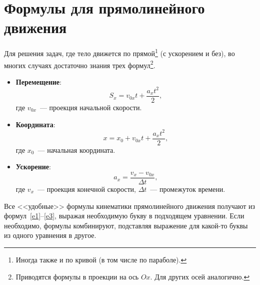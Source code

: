 \documentclass[main.tex]{subfiles}
\begin{document}


\pagestyle{empty}

 

\setcounter{section}{6
}
\addtocounter{section}{-1} 

\section{Формулы для прямолинейного движения}


Для решения задач, где тело движется по прямой\footnote{Иногда также и по кривой (в том числе по параболе).} (с ускорением и без), во многих случаях достаточно знания трех формул\footnote{Приводятся формулы в проекции на ось $Ox$. Для других осей аналогично.}.
\begin{itemize}
    \item \textbf{Перемещение}:
    \begin{equation}
    \label{e1}
    S_x=v_{0x}t+\dfrac{a_xt^2}{2},
    \end{equation}
    где $v_{0x}$~--- проекция начальной скорости.
    \item \textbf{Координата}:
    \begin{equation}
    \label{e2}
    x=x_0+v_{0x}t+\dfrac{a_xt^2}{2},
    \end{equation}
    где $x_0$~--- начальная координата.
    \item \textbf{Ускорение}:
    \begin{equation}
    \label{e3}
    a_x=\dfrac{v_x-v_{0x}}{\Delta t},
    \end{equation}
    где $v_{x}$~--- проекция конечной скорости, $\Delta t$~--- промежуток времени.
\end{itemize}

Все <<удобные>> формулы кинематики прямолинейного движения получают из формул~\eqref{e1}--\eqref{e3}, выражая необходимую букву в подходящем уравнении. Если необходимо, формулы комбинируют, подставляя выражение для какой-то буквы из одного уравнения в другое.
\end{document}
